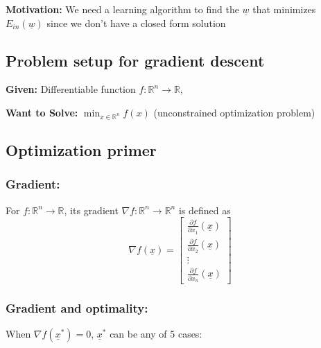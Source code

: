\textbf{Motivation:} We need a learning algorithm to find the $\underline{w}$ that minimizes $E_{in} (\underline{w})$ since we don't have a closed form solution

\subsection{Problem setup for gradient descent}
\begin{intuition}
    \textbf{Given:} Differentiable function $f: \mathbb{R}^n \to \mathbb{R}$, 
    \vspace{1em}

    \textbf{Want to Solve:} $\min_{x \in \mathbb{R}^n} f(x)$ (unconstrained optimization problem)
\end{intuition}

\subsection{Optimization primer}
    \subsubsection{Gradient:}
    \begin{definition}
        For $f: \mathbb{R}^n \to \mathbb{R}$, its gradient $\nabla f: \mathbb{R}^n \to \mathbb{R}^n$ is defined as
            \[
            \nabla f(\underline{x}) =
            \begin{bmatrix}
            \frac{\partial f}{\partial x_1}(\underline{x}) \\
            \frac{\partial f}{\partial x_2}(\underline{x}) \\
            \vdots \\
            \frac{\partial f}{\partial x_n}(\underline{x})
            \end{bmatrix}
            \]
    \end{definition}

    \begin{example}
    \end{example}

    \subsubsection{Gradient and optimality:}
    \begin{definition}
        When $\nabla f(\underline{x}^*) = 0$, $\underline{x}^*$ can be any of 5 cases:

    \end{definition}


